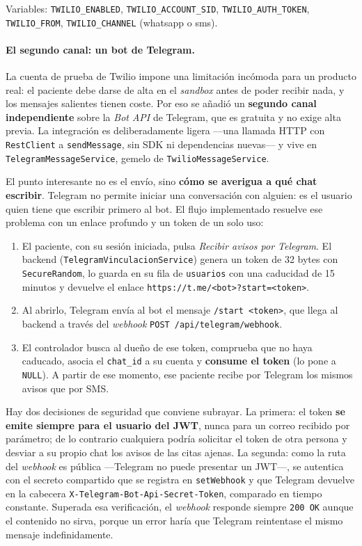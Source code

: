 \documentclass[12pt,a4paper]{report}
\begin{document}
Variables: \texttt{TWILIO\_ENABLED}, \texttt{TWILIO\_ACCOUNT\_SID}, \texttt{TWILIO\_AUTH\_TOKEN}, \texttt{TWILIO\_FROM}, \texttt{TWILIO\_CHANNEL} (whatsapp o sms).

\paragraph{El segundo canal: un bot de Telegram.} La cuenta de prueba de Twilio impone una limitación incómoda para un producto real: el paciente debe darse de alta en el \emph{sandbox} antes de poder recibir nada, y los mensajes salientes tienen coste. Por eso se añadió un \textbf{segundo canal independiente} sobre la \emph{Bot API} de Telegram, que es gratuita y no exige alta previa. La integración es deliberadamente ligera —una llamada HTTP con \texttt{RestClient} a \texttt{sendMessage}, sin SDK ni dependencias nuevas— y vive en \texttt{TelegramMessageService}, gemelo de \texttt{TwilioMessageService}.

El punto interesante no es el envío, sino \textbf{cómo se averigua a qué chat escribir}. Telegram no permite iniciar una conversación con alguien: es el usuario quien tiene que escribir primero al bot. El flujo implementado resuelve ese problema con un enlace profundo y un token de un solo uso:
\begin{enumerate}
  \item El paciente, con su sesión iniciada, pulsa \emph{Recibir avisos por Telegram}. El backend (\texttt{TelegramVinculacionService}) genera un token de 32 bytes con \texttt{SecureRandom}, lo guarda en su fila de \texttt{usuarios} con una caducidad de 15 minutos y devuelve el enlace \texttt{https://t.me/<bot>?start=<token>}.
  \item Al abrirlo, Telegram envía al bot el mensaje \texttt{/start <token>}, que llega al backend a través del \emph{webhook} \texttt{POST /api/telegram/webhook}.
  \item El controlador busca al dueño de ese token, comprueba que no haya caducado, asocia el \texttt{chat\_id} a su cuenta y \textbf{consume el token} (lo pone a \texttt{NULL}). A partir de ese momento, ese paciente recibe por Telegram los mismos avisos que por SMS.
\end{enumerate}

Hay dos decisiones de seguridad que conviene subrayar. La primera: el token \textbf{se emite siempre para el usuario del JWT}, nunca para un correo recibido por parámetro; de lo contrario cualquiera podría solicitar el token de otra persona y desviar a su propio chat los avisos de las citas ajenas. La segunda: como la ruta del \emph{webhook} es pública —Telegram no puede presentar un JWT—, se autentica con el secreto compartido que se registra en \texttt{setWebhook} y que Telegram devuelve en la cabecera \texttt{X-Telegram-Bot-Api-Secret-Token}, comparado en tiempo constante. Superada esa verificación, el \emph{webhook} responde siempre \texttt{200 OK} aunque el contenido no sirva, porque un error haría que Telegram reintentase el mismo mensaje indefinidamente.
\end{document}

